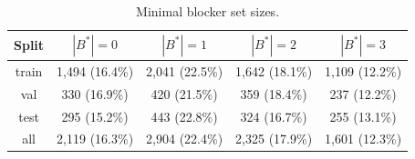 \begin{table}[htbp]
  \centering
  \caption{Minimal blocker set sizes.}
  \label{tab:stage1_minimal_blocker_distribution}
  \small
  \setlength{\tabcolsep}{4.5pt}
  \begin{tabular}{ccccc}
    \toprule
    Split & $|B^*|=0$ & $|B^*|=1$ & $|B^*|=2$ & $|B^*|=3$ \\
    \midrule
    train & 1,494 (16.4\%) & 2,041 (22.5\%) & 1,642 (18.1\%) & 1,109 (12.2\%) \\
    val & 330 (16.9\%) & 420 (21.5\%) & 359 (18.4\%) & 237 (12.2\%) \\
    test & 295 (15.2\%) & 443 (22.8\%) & 324 (16.7\%) & 255 (13.1\%) \\
    all & 2,119 (16.3\%) & 2,904 (22.4\%) & 2,325 (17.9\%) & 1,601 (12.3\%) \\
    \bottomrule
  \end{tabular}
\end{table}
